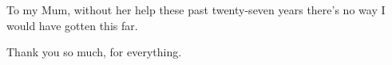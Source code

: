 
\begin{dedication} %

To my Mum, without her help these past twenty-seven years there's no way I would have gotten this far.

Thank you so much, for everything.

\end{dedication}


